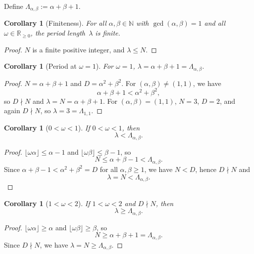 \documentclass[11pt]{article}
\theoremstyle{plain}
\newtheorem{corollary}[theorem]{Corollary}
\theoremstyle{definition}
\theoremstyle{remark}
\begin{document}
Define \(\Lambda_{\alpha,\beta} := \alpha + \beta + 1\).

\begin{corollary}[Finiteness]\label{cor:finite}
For all \(\alpha, \beta \in \mathbb{N}\) with \(\gcd(\alpha,\beta)=1\) and
all \(\omega \in \mathbb{R}_{\ge 0}\), the period length~\(\lambda\) is
finite.
\end{corollary}

\begin{proof}
\(N\) is a finite positive integer, and \(\lambda \le N\).
\end{proof}

\begin{corollary}[Period at \(\omega = 1\)]\label{cor:omega1}
For \(\omega = 1\), \(\lambda = \alpha + \beta + 1 = \Lambda_{\alpha,\beta}\).
\end{corollary}

\begin{proof}
\(N = \alpha + \beta + 1\) and \(D = \alpha^2+\beta^2\).
For \((\alpha,\beta) \ne (1,1)\), we have
\[
    \alpha+\beta+1 < \alpha^2+\beta^2,
\]
so \(D \nmid N\) and \(\lambda = N = \alpha+\beta+1\).
For \((\alpha,\beta) = (1,1)\), \(N = 3\), \(D = 2\), and again
\(D \nmid N\), so \(\lambda = 3 = \Lambda_{1,1}\).
\end{proof}

\begin{corollary}[\(0 < \omega < 1\)]\label{cor:small_omega}
If \(0 < \omega < 1\), then
\[
    \lambda < \Lambda_{\alpha,\beta}.
\]
\end{corollary}

\begin{proof}
\(\lfloor\omega\alpha\rfloor \le \alpha - 1\) and
\(\lfloor\omega\beta\rfloor \le \beta - 1\), so
\[
    N \le \alpha + \beta - 1 < \Lambda_{\alpha,\beta}.
\]
Since \(\alpha + \beta - 1 < \alpha^2 + \beta^2 = D\) for all
\(\alpha, \beta \ge 1\), we have \(N < D\), hence \(D \nmid N\) and
\[
    \lambda = N < \Lambda_{\alpha,\beta}.
\]
\end{proof}

\begin{corollary}[\(1 < \omega < 2\)]\label{cor:medium_omega}
If \(1 < \omega < 2\) and \(D \nmid N\), then
\[
    \lambda \ge \Lambda_{\alpha,\beta}.
\]
\end{corollary}

\begin{proof}
\(\lfloor\omega\alpha\rfloor \ge \alpha\) and
\(\lfloor\omega\beta\rfloor \ge \beta\), so
\[
    N \ge \alpha + \beta + 1 = \Lambda_{\alpha,\beta}.
\]
Since \(D \nmid N\), we have \(\lambda = N \ge \Lambda_{\alpha,\beta}\).
\end{proof}
\end{document}
